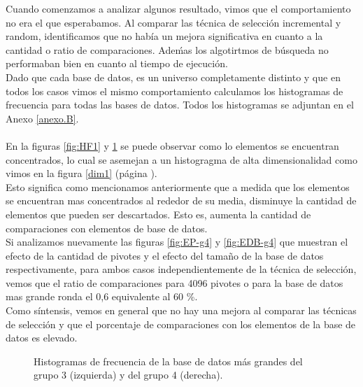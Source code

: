 Cuando comenzamos a analizar algunos resultado, vimos que el comportamiento no era el que esperabamos. Al comparar las  t\'ecnica de selecci\'on incremental y random, identificamos que no hab\'ia un mejora significativa en cuanto a la cantidad o ratio de comparaciones. Ade\'mas los algotirtmos de b\'usqueda no performaban bien en cuanto al tiempo de ejecución.\\

Dado que cada base de datos, es un universo completamente distinto y que en todos los casos vimos el mismo comportamiento calculamos los histogramas de frecuencia para todas las bases de datos. Todos los histogramas se adjuntan en el Anexo \ref{anexo.B}.\\\\

En la figuras \ref{fig:HF1} y \ref{fig:HF2} se puede observar como lo elementos se encuentran concentrados, lo cual se asemejan a un histogragma de alta dimensionalidad como vimos en la figura \ref{dim1} (p\'agina \pageref{dim1}).\\

Esto significa como mencionamos anteriormente que a medida que los elementos se encuentran mas concentrados al rededor de su media, disminuye la cantidad de elementos que pueden ser descartados. Esto es, aumenta la cantidad de comparaciones con elementos de base de datos.\\

Si analizamos nuevamente las figuras \ref{fig:EP-g4} y \ref{fig:EDB-g4} que muestran el efecto de la cantidad de pivotes y el efecto del tama\~no de la base de datos respectivamente, para ambos casos independientemente de la t\'ecnica de selecci\'on, vemos que el ratio de comparaciones para 4096 pivotes o para la base de datos mas grande ronda el 0,6 equivalente al 60	\%.\\

Como s\'intensis, vemos en general que no hay una mejora al comparar las t\'ecnicas de selecci\'on y que el porcentaje de comparaciones con los elementos de la base de datos es elevado.\\

\begin{figure}[tb]
\centering
{}
		\caption{\small Histogramas de frecuencia de la base de datos m\'as grandes del grupo 1 (izquierda) y del grupo 2 (derecha).}
		\label{fig:HF1}
		
	\caption{\small Histogramas de frecuencia de la base de datos m\'as grandes del grupo 3 (izquierda) y del grupo 4 (derecha).}
		\label{fig:HF2}
\end{figure}